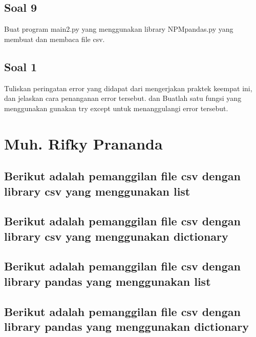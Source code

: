 \subsection{Soal 9}
Buat program main2.py yang menggunakan library NPMpandas.py yang membuat dan membaca file csv.



\subsection{Soal 1}
Tuliskan  peringatan  error  yang  didapat  dari  mengerjakan  praktek  keempat  ini, dan  jelaskan  cara  penanganan  error  tersebut.   dan  Buatlah  satu  fungsi  yang menggunakan gunakan try except untuk menanggulangi error tersebut.



\section{Muh. Rifky Prananda}
\subsection{Berikut adalah pemanggilan file csv dengan library csv yang menggunakan list}


\subsection{Berikut adalah pemanggilan file csv dengan library csv yang menggunakan dictionary}


\subsection{Berikut adalah pemanggilan file csv dengan library pandas yang menggunakan list}


\subsection{Berikut adalah pemanggilan file csv dengan library pandas yang menggunakan dictionary}


